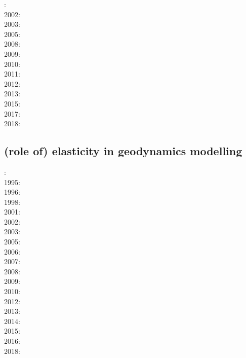 : \cite{coks00}\\
2002: \cite{cacp02}\cite{coks02}\\
2003: \cite{cock03}\\
2005: \cite{cacs05}\cite{coks05}\\
2008: \cite{kans08}\cite{mofh08}\cite{dole08}\\
2009: \cite{coks09}\cite{cogo09}\\
2010: \cite{ngpc10}\cite{conp10}\cite{mofp10}\\
2011: \cite{geor11}\cite{ngpc11}\\
2012: \cite{kauf12}\cite{ngpe12}\cite[chapt. 31]{lomw12}\\
2013: \cite{vyrc13}\\
2015: \cite{lelk15} \\
2017: \cite{fewk17}\cite{iglo17}\cite{hepb17}\\
2018: \cite{puth18}


\subsection*{(role of) elasticity in geodynamics modelling}

:\cite{yusa84}\\
1995:\cite{budi95}\\
1996:\cite{hach96}\\
1998:\cite{copo98}\\
2001:\cite{vapy01}\\
2002:\cite{mumh02}\cite{modm02}\\
2003:\cite{hukm03}\cite{wabu03}\\
2005:\cite{mure05}\\
2006:\cite{kapo06}\cite{mudm06}\\
2007:\cite{kabe07}\\
2008:\cite{baso08}\cite{fukk08}\\
2009:\cite{qurj09}\\
2010:\cite{bepo10}\\
2012:\cite{gerb12}\\
2013:\cite{wahd13}\\
2014:\cite{famc14}\cite{fogm14}\\
2015:\cite{thkp15}\\
2016:\cite{bafl16}\cite{jads16}\cite{olbm16}\cite{bafl16}\\
2018:\cite{dusd18}


